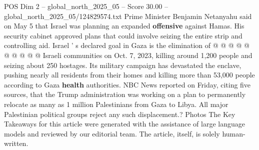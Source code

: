 \begin{textsample}{POS Dim 2 – global\_north\_2025\_05 – Score 30.00 – global\_north\_2025\_05/124829574.txt}
Prime Minister Benjamin Netanyahu said on May 5 that Israel was planning an expanded \textbf{offensive} against Hamas.
His security cabinet approved plans that could involve seizing the entire strip and controlling aid.
Israel ' s declared goal in Gaza is the elimination of @ @ @ @ @ @ @ @ @ @ Israeli communities on Oct. 7, 2023, killing around 1,200 people and seizing about 250 hostages.
Its military campaign has devastated the enclave, pushing nearly all residents from their homes and killing more than 53,000 people according to Gaza \textbf{health} authorities.
NBC News reported on Friday, citing five sources, that the Trump administration was working on a plan to permanently relocate as many as 1 million Palestinians from Gaza to Libya.
All major Palestinian political groups reject any such displacement.?
Photos The Key Takeaways for this article were generated with the assistance of large language models and reviewed by our editorial team.
The article, itself, is solely human-written.

\end{textsample}
